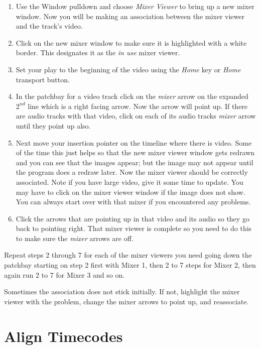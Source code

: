 \begin{enumerate}[resume]
	\item Use the Window pulldown and choose \textit{Mixer Viewer} to bring up a new mixer window.  Now you will be making an association between the mixer viewer and the track’s video.
    \item Click on the new mixer window to make sure it is highlighted with a white border. This designates it as the \textit{in use} mixer viewer.
    \item Set your play to the beginning of the video using the \textit{Home} key or \textit{Home} transport button.
    \item In the patchbay for a video track click on the \textit{mixer} arrow on the expanded $2^{nd}$ line which is a right facing arrow.  Now the arrow will point up.  If there are audio tracks with that video, click on each of its audio tracks \textit{mixer} arrow until they point up also.
    \item Next move your insertion pointer on the timeline where there is video.  Some of the time this just helps so that the new mixer viewer window gets redrawn and you can see that the images appear; but the image may not appear until the program does a redraw later.  Now the mixer viewer should be
    correctly associated.  Note if you have large video, give it some time to update.  You may have to click on the mixer viewer window if the image does not show.  You can always start over with that mixer if you encountered any problems.
    \item Click the arrows that are pointing up in that video and its audio so they go back to pointing right. That mixer viewer is complete so you need to do this to make sure the \textit{mixer} arrows are off.
\end{enumerate}

Repeat steps 2 through 7 for each of the mixer viewers you need going down the patchbay starting on step 2 first with Mixer 1, then 2 to 7 steps for Mixer 2, then again run 2 to 7 for Mixer 3 and so on.

Sometimes the association does not stick initially.  If not, highlight the mixer viewer with the problem, change the mixer arrows to point up, and reassociate.

\section{Align Timecodes}%
\label{sec:align_timecodes}

